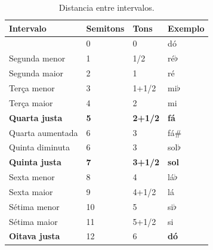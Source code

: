 \begin{table}[h]
  \centering
  \begin{tabular}{|l|l|l|l|}
  \hline
  \textbf{Intervalo} & \textbf{Semitons} & \textbf{Tons} & \textbf{Exemplo}     \\ \hline \hline
  ~                & 0        & 0        & dó \\ \hline
  Segunda menor    & 1        & 1/2      & ré$\flat$ \\ \hline
  Segunda maior    & 2        & 1        & ré        \\ \hline  \hline
  Terça menor      & 3        & 1+1/2    & mi$\flat$ \\ \hline
  Terça maior      & 4        & 2        & mi        \\ \hline  \hline
  \textbf{Quarta justa}     & \textbf{5}        & \textbf{2+1/2}    & \textbf{fá}        \\ \hline
  Quarta aumentada & 6        & 3        & fá$\#$    \\ \hline \hline
  Quinta diminuta  & 6        & 3        & sol$\flat$ \\ \hline 
  \textbf{Quinta justa}     & \textbf{7}        & \textbf{3+1/2}    & \textbf{sol}      \\ \hline \hline
  Sexta menor      & 8        & 4        & lá$\flat$ \\ \hline
  Sexta maior      & 9        & 4+1/2    & lá        \\ \hline \hline
  Sétima menor     & 10       & 5        & si$\flat$ \\ \hline
  Sétima maior     & 11       & 5+1/2    & si        \\ \hline \hline
  \textbf{Oitava justa}     & 12       & 6        & \textbf{dó} \\ \hline
  \end{tabular}
  \caption{Distancia entre intervalos.}
  \label{tab:intervalomelodico}
\end{table}
